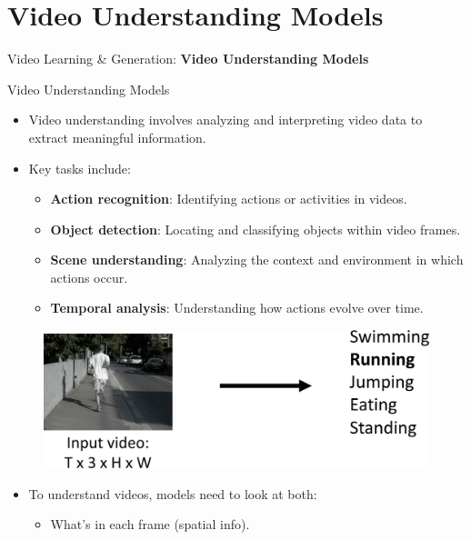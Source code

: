 \section{Video Understanding Models}
\begin{frame}{}
    \LARGE Video Learning \& Generation: \textbf{Video Understanding Models}
\end{frame}

\begin{frame}[allowframebreaks]{Video Understanding Models}
    \begin{itemize}
        \item Video understanding involves analyzing and interpreting video data to extract meaningful information.
        \item Key tasks include:
        \begin{itemize}
            \item \textbf{Action recognition}: Identifying actions or activities in videos.
            \item \textbf{Object detection}: Locating and classifying objects within video frames.
            \item \textbf{Scene understanding}: Analyzing the context and environment in which actions occur.
            \item \textbf{Temporal analysis}: Understanding how actions evolve over time.
        \end{itemize}
    \end{itemize}
\framebreak
    \begin{figure}
        \centering
        \includegraphics[width=1\textwidth,height=0.9\textheight,keepaspectratio]{images/video/slide_4_1_img.jpg}
    \end{figure}
\framebreak
    \begin{itemize}
        \item To understand videos, models need to look at both:
        \begin{itemize}
            \item What’s in each frame (spatial info).

\end{itemize}
\end{itemize}
\end{frame}
